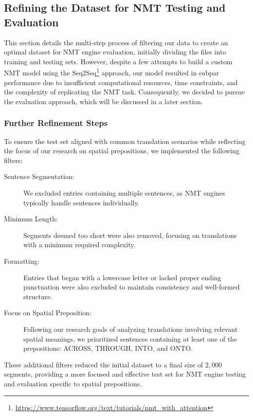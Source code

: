 \subsection{Refining the Dataset for NMT Testing and Evaluation}

This section details the multi-step process of filtering our data to create an optimal dataset for NMT engine evaluation, initially dividing the files into training and testing sets. However, despite a few attempts to build a custom NMT model using the Seq2Seq\footnote{\href{https://www.tensorflow.org/text/tutorials/nmt\_with\_attention}{https://www.tensorflow.org/text/tutorials/nmt\_with\_attention}} approach, our model resulted in subpar performance due to insufficient computational resources, time constraints, and the complexity of replicating the NMT task. Consequently, we decided to pursue the evaluation approach, which will be discussed in a later section.


\subsubsection{Further Refinement Steps}

To ensure the test set aligned with common translation scenarios while reflecting the focus of our research on spatial prepositions, we implemented the following filters:

\begin{description}
    \item[Sentence Segmentation:] We excluded entries containing multiple sentences, as NMT engines typically handle sentences individually.
    \item[Minimum Length:] Segments deemed too short were also removed, focusing on translations with a minimum required complexity.
    \item[Formatting:] Entries that began with a lowercase letter or lacked proper ending punctuation were also excluded to maintain consistency and well-formed structure.
    \item[Focus on Spatial Preposition:] Following our research goals of analyzing translations involving relevant spatial meanings, we prioritized sentences containing at least one of the prepositions: ACROSS, THROUGH, INTO, and ONTO.
\end{description}   

These additional filters reduced the initial dataset to a final size of $2,000$ segments, providing a more focused and effective test set for NMT engine testing and evaluation specific to spatial prepositions.

